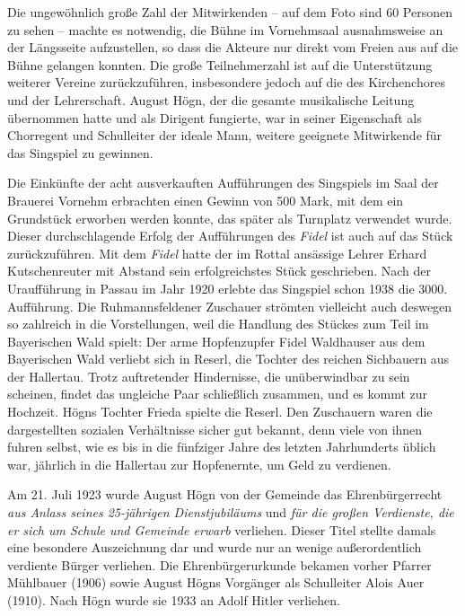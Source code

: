 \documentclass{book}
\newcommand{\zitat}[1]{\textit{#1}}
\begin{document}
Die ungewöhnlich große Zahl der Mitwirkenden – auf dem Foto sind 60
Personen zu sehen – machte es notwendig, die Bühne im Vornehmsaal
aus\-nahmsweise an der Längsseite aufzustellen, so dass die Akteure nur
direkt vom Freien aus auf die Bühne gelangen konnten. Die große
Teilnehmerzahl ist auf die Unterstützung weiterer Vereine
zurückzuführen, insbesondere je\-doch auf die des Kirchenchores und der
Lehrerschaft. August Högn, der die gesamte musikalische Leitung
übernommen hatte und als Dirigent fungierte, war in seiner Eigenschaft
als Chorregent und Schulleiter der ideale Mann, weitere geeignete
Mitwirkende für das Singspiel zu gewinnen.

 

Die Einkünfte der acht ausverkauften Aufführungen des Singspiels im Saal
der Brauerei Vornehm erbrachten einen Gewinn von 500 Mark, mit dem ein
Grundstück erworben werden konnte, das später als Turnplatz verwendet
wurde. Dieser durchschlagende Erfolg der Aufführungen des
\textit{Fidel} ist auch auf das Stück zurückzuführen. Mit dem
\textit{Fidel} hatte der im Rottal ansässige Lehrer Erhard
Kutschenreuter mit Abstand sein erfolgreichstes Stück geschrieben. Nach
der Uraufführung in Passau im Jahr 1920 erlebte das Singspiel schon
1938 die 3000. Aufführung. Die Ruhmannsfeldener Zuschauer strömten
viel\-leicht auch deswegen so zahlreich in die Vorstellungen, weil die
Handlung des Stückes zum Teil im Bayerischen Wald spielt: Der arme
Hopfenzupfer Fidel Waldhauser aus dem Bayerischen Wald verliebt sich in
Reserl, die Tochter des reichen Sichbauern aus der Hallertau. Trotz
auftretender Hindernisse, die un\-überwindbar zu sein scheinen, findet
das ungleiche Paar schließlich zusam\-men, und es kommt zur Hochzeit.
Högns Tochter Frieda spielte die Reserl. Den Zuschauern waren die
dargestellten sozialen Verhältnisse sicher gut bekannt, denn viele von
ihnen fuhren selbst, wie es bis in die fünfziger Jahre des letzten
Jahrhunderts üblich war, jährlich in die Hallertau zur Hopfenernte, um
Geld zu verdienen.

Am 21. Juli 1923 wurde August Högn von der Gemeinde das
Ehrenbür\-gerrecht \zitat{aus Anlass seines 25-jährigen
Dienstjubiläums }und \zitat{für die großen Verdienste, die er
sich um Schule und Gemeinde erwarb }verliehen. Dieser Titel stellte
damals eine besondere Auszeichnung dar und wurde nur an wenige
außerordentlich verdiente Bürger verliehen. Die Ehrenbürgerurkunde
bekamen vorher Pfarrer Mühlbauer (1906) sowie August Högns Vorgänger
als Schulleiter Alois Auer (1910). Nach Högn wurde sie 1933 an Adolf
Hitler verliehen.
\end{document}
